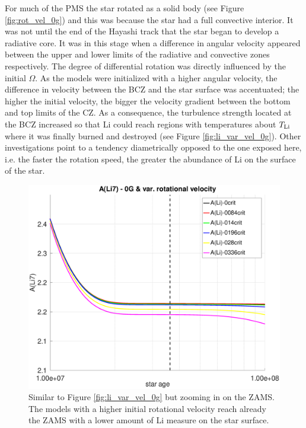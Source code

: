 \documentclass[fleqn,usenatbib]{mnras}
\begin{document}
For much of the PMS the star rotated as a solid body (see Figure \ref{fig:rot_vel_0g}) and this was because the star had a full convective interior. It was not until the end of the Hayashi track that the star began to develop a radiative core. It was in this stage when a difference in angular velocity appeared between the upper and lower limits of the radiative and convective zones respectively. The degree of differential rotation was directly influenced by the initial $\Omega$. As the models were initialized with a higher angular velocity, the difference in velocity between the BCZ and the star surface was accentuated; the higher the initial velocity, the bigger the velocity gradient between the bottom and top limits of the CZ. As a consequence, the turbulence strength located at the BCZ increased so that Li could reach regions with temperatures about $T_{\mathrm{Li}}$ where it was finally burned and destroyed (see Figure  \ref{fig:li_var_vel_0g}). Other investigations \citep{Bouvier2018, Baraffe2017}  point to a tendency diametrically opposed to the one exposed here, i.e. the faster the rotation speed, the greater the abundance of Li on the surface of the star. \par

\begin{figure}
	\includegraphics[trim = 25mm 10mm 15mm 10mm clip,width=\columnwidth]{figures/li_var_vel_0_0g_z1.eps}
    \caption {Similar to Figure \ref{fig:li_var_vel_0g} but zooming in on the ZAMS. The models with a higher initial rotational velocity reach already the ZAMS with a lower amount of Li measure on the star surface.}
    \label{fig:li_var_vel_0g_z1}
\end{figure}
\end{document}
